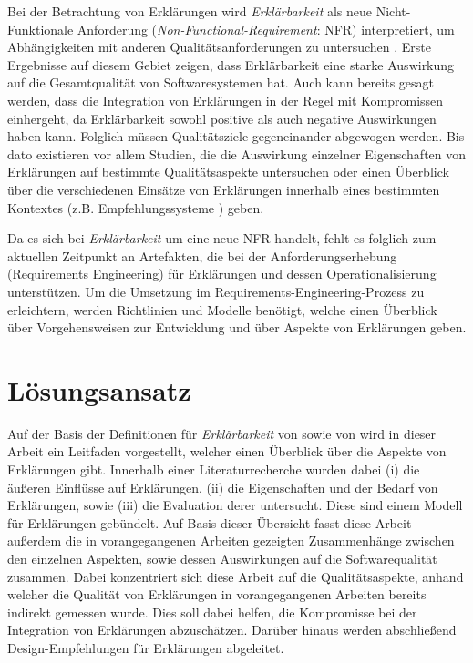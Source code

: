 Bei der Betrachtung von Erklärungen wird \textit{Erklärbarkeit} als neue Nicht-Funktionale Anforderung (\textit{Non-Functional-Requirement}: NFR) interpretiert, um Abhängigkeiten mit anderen Qualitätsanforderungen zu untersuchen \cite{kohl_explainability_2019, chazette2020explainability}. Erste Ergebnisse auf diesem Gebiet zeigen, dass Erklärbarkeit eine starke Auswirkung auf die Gesamtqualität von Softwaresystemen hat. Auch kann bereits gesagt werden, dass die Integration von Erklärungen in der Regel mit Kompromissen einhergeht, da Erklärbarkeit sowohl positive als auch negative Auswirkungen haben kann. Folglich müssen Qualitätsziele gegeneinander abgewogen werden. Bis dato existieren vor allem Studien, die die Auswirkung einzelner Eigenschaften von Erklärungen auf bestimmte Qualitätsaspekte untersuchen oder einen Überblick über die verschiedenen Einsätze von Erklärungen innerhalb eines bestimmten Kontextes (z.B. Empfehlungssysteme \cite{nunes_systematic_2017}) geben.

Da es sich bei \textit{Erklärbarkeit} um eine neue NFR handelt, fehlt es folglich zum aktuellen Zeitpunkt an Artefakten, die bei der Anforderungserhebung (Requirements Engineering) für Erklärungen und dessen Operationalisierung unterstützen. Um die Umsetzung im Requirements-Engineering-Prozess zu erleichtern, werden Richtlinien und Modelle benötigt, welche einen Überblick über Vorgehensweisen zur Entwicklung und über Aspekte von Erklärungen geben. 

\section{Lösungsansatz}

Auf der Basis der Definitionen für \textit{Erklärbarkeit} von \citeauthor[]{chazette_knowledge_nodate} sowie von \citeauthor[]{kohl_explainability_2019} wird in dieser Arbeit ein Leitfaden vorgestellt, welcher einen Überblick über die Aspekte von Erklärungen gibt. Innerhalb einer Literaturrecherche wurden dabei (i) die äußeren Einflüsse auf Erklärungen, (ii) die Eigenschaften und der Bedarf von Erklärungen, sowie (iii) die Evaluation derer untersucht. Diese sind einem Modell für Erklärungen gebündelt. Auf Basis dieser Übersicht fasst diese Arbeit außerdem die in vorangegangenen Arbeiten gezeigten Zusammenhänge zwischen den einzelnen Aspekten, sowie dessen Auswirkungen auf die Softwarequalität zusammen. Dabei konzentriert sich diese Arbeit auf die Qualitätsaspekte, anhand welcher die Qualität von Erklärungen in vorangegangenen Arbeiten bereits indirekt gemessen wurde. Dies soll dabei helfen, die Kompromisse bei der Integration von Erklärungen abzuschätzen. Darüber hinaus werden abschließend Design-Empfehlungen für Erklärungen abgeleitet.

